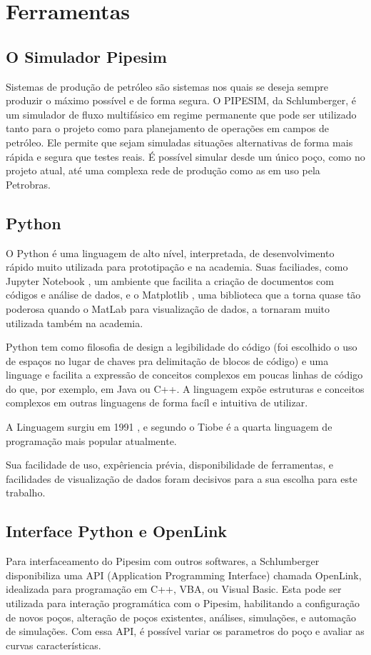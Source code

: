 
\chapter{Ferramentas} \label{chap:4}


\section{O Simulador Pipesim}
Sistemas de produção de petróleo são sistemas nos quais se deseja sempre produzir o máximo possível e de forma segura.
O PIPESIM, da Schlumberger, é um simulador de fluxo multifásico em regime permanente que pode ser utilizado tanto para o projeto como para planejamento de operações em campos de petróleo. Ele permite que sejam simuladas situações alternativas de forma mais rápida e segura que testes reais. É possível simular desde um único poço, como no projeto atual, até uma complexa rede de produção como as em uso pela Petrobras.

\section{Python}

O Python é uma linguagem de alto nível, interpretada, de desenvolvimento rápido muito utilizada para prototipação e na academia. Suas faciliades, como Jupyter Notebook \cite{jupyter}, um ambiente que facilita a criação de documentos com códigos e análise de dados, e o Matplotlib \cite{matplotlib}, uma biblioteca que a torna quase tão poderosa quando o MatLab para visualização de dados, a tornaram muito utilizada também na academia.

Python tem como filosofia de design a legibilidade do código (foi escolhido o uso de espaços no lugar de chaves pra delimitação de blocos de código) e uma linguage e facilita a expressão de conceitos complexos em poucas linhas de código do que, por exemplo, em Java ou C++. A linguagem expõe estruturas e conceitos complexos em outras linguagens de forma facíl e intuitiva de utilizar.

A Linguagem surgiu em 1991 \cite{pythonHistory}, e segundo o Tiobe \cite{tiobe} é a quarta linguagem de programação mais popular atualmente.

Sua facilidade de uso, expêriencia prévia, disponibilidade de ferramentas, e facilidades de visualização de dados foram decisivos para a sua escolha para este trabalho. 

\section{Interface Python e OpenLink}
Para interfaceamento do Pipesim com outros softwares, a Schlumberger disponibiliza uma API (Application Programming Interface) chamada OpenLink, idealizada para programação em C++, VBA, ou Visual Basic. Esta pode ser utilizada para interação programática com o Pipesim, habilitando a configuração de novos poços, alteração de poços existentes, análises, simulações, e automação de simulações. Com essa API, é possível variar os parametros do poço e avaliar as curvas características.




